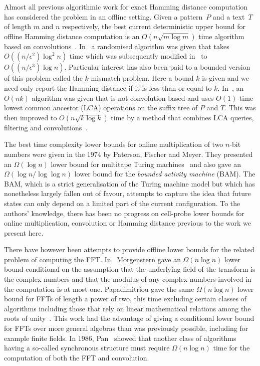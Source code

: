 \documentclass[11pt]{article}
\numberwithin{equation}{section}
\theoremstyle{definition}
\theoremstyle{plain}
\begin{document}
Almost all previous algorithmic work for exact Hamming distance computation has considered the problem in an offline setting.  Given a pattern~$P$ and a text~$T$ of length $m$ and $n$ respectively, the best current deterministic upper bound for offline Hamming distance computation is an $O(n\sqrt{m\log{m}})$ time algorithm based on convolutions~\cite{Abrahamson:1987, Kosaraju:1987}. In~\cite{Karloff:1993} a randomised algorithm was given that takes $O((n/{\epsilon}^2)\log^2{n})$ time which was subsequently modified in~\cite{Indyk:1998} to $O((n/{{\epsilon}^3}) \log{n})$. Particular interest has also been paid to a bounded version of this problem called the $k$-mismatch problem.  Here a bound $k$ is given and we need only report the Hamming distance if it is less than or equal to $k$. In~\cite{LV:1986a}, an $O(nk)$ algorithm was given that is not convolution based and uses
%
$O(1)$-time  %
lowest common ancestor (LCA) operations on the suffix tree of $P$ and $T$. This was then  improved to $O(n\sqrt{k\log{k}})$ time by a method that combines LCA queries, filtering and convolutions~\cite{ALP:2004}.

The best time complexity lower bounds for online multiplication of two $n$-bit numbers were given in the 1974 by Paterson, Fischer and Meyer.  They presented an $\Omega(\log{n})$ lower bound for multitape Turing machines~\cite{PFM:1974} and also gave an $\Omega(\log{n}/\log{\log n})$ lower bound for the \emph{bounded activity machine} (BAM).  The BAM, which is a strict generalisation of the Turing machine model but which has nonetheless largely fallen out of favour, attempts to capture the idea that future states can only depend on a limited part of the current configuration.  To the authors' knowledge, there has been no progress on cell-probe lower bounds for online multiplication, convolution or Hamming distance previous to the work we present here.

There have however been attempts to provide offline lower bounds for the related problem of computing the FFT\@.  In~\cite{Morgenstern:1973} Morgenstern gave an $\Omega(n \log{n})$ lower bound conditional on the assumption that the underlying field of the transform is the complex numbers and that the modulus of any complex numbers involved in the computation is at most one.  Papadimitriou gave the same $\Omega(n \log{n})$ lower bound for FFTs of length a power of two, this time excluding certain classes of algorithms including those that rely on linear mathematical relations among the roots of unity~\cite{Papadimitriou:1979}.  This work had the advantage of giving a conditional lower bound for FFTs over more general algebras than was previously possible, including for example finite fields.  In 1986, Pan~\cite{Pan:1986} showed that another class of algorithms having a so-called synchronous structure must require $\Omega(n \log{n})$ time for the computation of both the FFT and convolution.
\end{document}
